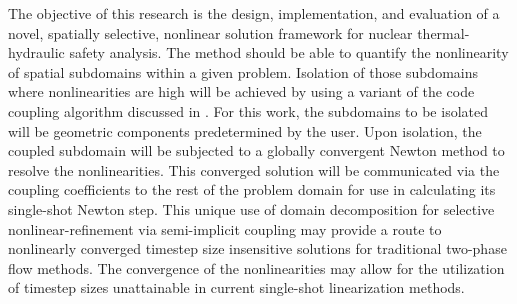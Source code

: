 The objective of this research is the design, implementation, and evaluation of a novel, spatially selective, nonlinear solution framework for nuclear thermal-hydraulic safety analysis.
The method should be able to quantify the nonlinearity of spatial subdomains within a given problem.
Isolation of those subdomains where nonlinearities are high will be achieved by using a variant of the code coupling algorithm discussed in .
For this work, the subdomains to be isolated will be geometric components predetermined by the user.
Upon isolation, the coupled subdomain will be subjected to a globally convergent Newton method to resolve the nonlinearities.
This converged solution will be communicated via the coupling coefficients to the rest of the problem domain for use in calculating its single-shot Newton step.
This unique use of domain decomposition for selective nonlinear-refinement via semi-implicit coupling may provide a route to nonlinearly converged timestep size insensitive solutions for traditional two-phase flow methods.
The convergence of the nonlinearities may allow for the utilization of timestep sizes unattainable in current single-shot linearization methods.